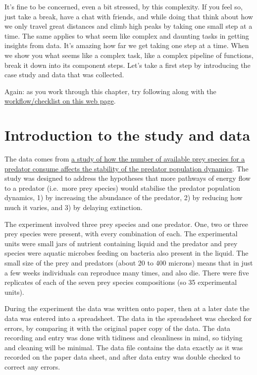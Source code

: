 \documentclass[]{book}
\begin{document}
It's fine to be concerned, even a bit stressed, by this complexity. If you feel so, just take a break, have a chat with friends, and while doing that think about how we only travel great distances and climb high peaks by taking one small step at a time. The same applies to what seem like complex and daunting tasks in getting insights from data. It's amazing how far we get taking one step at a time. When we show you what seems like a complex task, like a complex pipeline of functions, break it down into its component steps. Let's take a first step by introducing the case study and data that was collected.

Again: as you work through this chapter, try following along with the \href{http://r4all.org/posts/workflow-checklist-for-data-analysis/}{workflow/checklist on this web page}.

\hypertarget{introduction-to-the-study-and-data-1}{%
\section{Introduction to the study and data}\label{introduction-to-the-study-and-data-1}}

The data comes from \href{https://besjournals.onlinelibrary.wiley.com/doi/abs/10.1046/j.1365-2656.2000.00446.x}{a study of how the number of available prey species for a predator consume affects the stability of the predator population dynamics}. The study was designed to address the hypotheses that more pathways of energy flow to a predator (i.e.~more prey species) would stabilise the predator population dynamics, 1) by increasing the abundance of the predator, 2) by reducing how much it varies, and 3) by delaying extinction.

The experiment involved three prey species and one predator. One, two or three prey species were present, with every combination of each. The experimental units were small jars of nutrient containing liquid and the predator and prey species were aquatic microbes feeding on bacteria also present in the liquid. The small size of the prey and predators (about 20 to 400 microns) means that in just a few weeks individuals can reproduce many times, and also die. There were five replicates of each of the seven prey species compositions (so 35 experimental units).

During the experiment the data was written onto paper, then at a later date the data was entered into a spreadsheet. The data in the spreadsheet was checked for errors, by comparing it with the original paper copy of the data. The data recording and entry was done with tidiness and cleanliness in mind, so tidying and cleaning will be minimal. The data file contains the data exactly as it was recorded on the paper data sheet, and after data entry was double checked to correct any errors.
\end{document}
